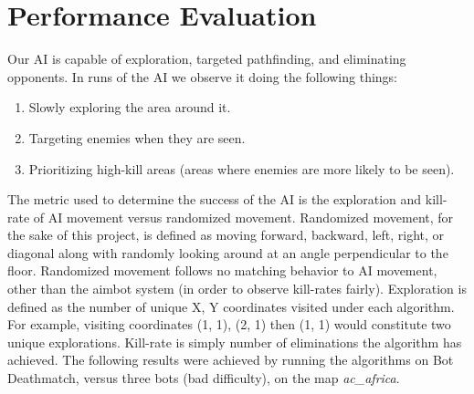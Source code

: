 \documentclass[11pt,a4paper]{article}
\begin{document}
\section{Performance Evaluation}

Our AI is capable of exploration, targeted pathfinding, and eliminating opponents. In runs of the AI we observe it doing the following things:

	\begin{enumerate}
    \item Slowly exploring the area around it.

    \item Targeting enemies when they are seen.

    \item Prioritizing high-kill areas (areas where enemies are more likely to be seen).
	\end{enumerate}

The metric used to determine the success of the AI is the exploration and kill-rate of AI movement versus randomized movement. Randomized movement, for the sake of this project, is defined as moving forward, backward, left, right, or diagonal along with randomly looking around at an angle perpendicular to the floor. Randomized movement follows no matching behavior to AI movement, other than the aimbot system (in order to observe kill-rates fairly). Exploration is defined as the number of unique X, Y coordinates visited under each algorithm. For example, visiting coordinates (1, 1), (2, 1) then (1, 1) would constitute two unique explorations. Kill-rate is simply number of eliminations the algorithm has achieved. The following results were achieved by running the algorithms on Bot Deathmatch, versus three bots (bad difficulty), on the map \textit{ac\_africa}.
\end{document}
